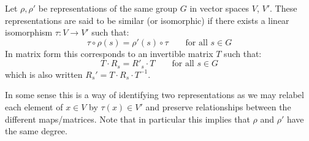 \documentclass[12pt]{article}
\begin{document}
\begin{definition}
    Let $\rho, \rho'$ be representations of the same group $G$ in vector spaces
    $V$, $V'$. These representations are said to be similar (or isomorphic) if there exists
    a linear isomorphism $\tau: V \to V'$ such that:
    \[ \tau \circ \rho(s) = \rho'(s) \circ \tau \qquad \text{for all $s \in G$} \]
    In matrix form this corresponds to an invertible matrix  $T$ such that:
    \[ T \cdot R_s = R'_s \cdot T \qquad \text{for all $s \in G$} \]
    which is also written $R_s' = T \cdot R_s \cdot T^{-1}$.
\end{definition}
In some sense this is a way of identifying two representations as we may relabel
each element of $x \in V$ by $\tau(x) \in V'$ and preserve relationships between the different
maps/matrices. Note that in particular this implies that $\rho$ and $\rho'$ have the same degree.
\end{document}
